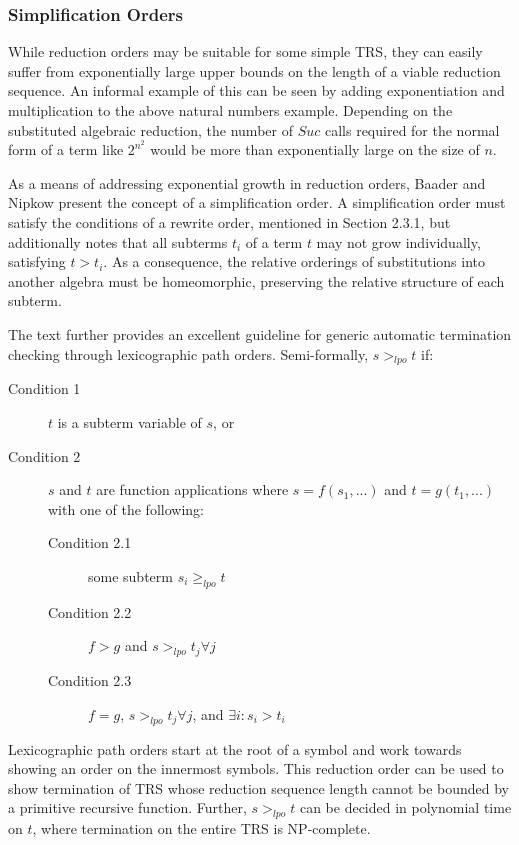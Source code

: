 \documentclass{article}
\begin{document}
\subsubsection{Simplification Orders}
While reduction orders may be suitable for some simple TRS, they can easily suffer from exponentially large upper bounds on the length of a viable reduction sequence.
An informal example of this can be seen by adding exponentiation and multiplication to the above natural numbers example.
Depending on the substituted algebraic reduction, the number of $Suc$ calls required for the normal form of a term like $2^{n^2}$ would be
more than exponentially large on the size of $n$.

As a means of addressing exponential growth in reduction orders, Baader and Nipkow \cite{baader1998term} present the concept of a simplification order.
A simplification order must satisfy the conditions of a rewrite order, mentioned in Section 2.3.1, but additionally notes that all subterms $t_i$ of a term $t$
may not grow individually, satisfying $t > t_i$. As a consequence, the relative orderings of substitutions into another algebra must be homeomorphic, preserving the relative
structure of each subterm.

The text further provides an excellent guideline for generic automatic termination checking through lexicographic path orders. Semi-formally, $s >_{lpo} t$ if:
\begin{description}
    \item[Condition 1] $t$ is a subterm variable of $s$, or
    \item[Condition 2] $s$ and $t$ are function applications where $s = f(s_1, ...)$ and $t = g(t_1,...)$ with one of the following:
    \begin{description}
        \item[Condition 2.1] some subterm $s_i \geq_{lpo} t$
        \item[Condition 2.2] $f > g$ and $s >_{lpo} t_j \forall j$
        \item[Condition 2.3] $f = g$, $s >_{lpo} t_j \forall j$, and $\exists i: s_i > t_i$
    \end{description}
\end{description}
Lexicographic path orders start at the root of a symbol and work towards showing an order on the innermost symbols.
This reduction order can be used to show termination of TRS whose reduction sequence length cannot be bounded by a primitive recursive function.
Further, $s >_{lpo} t$ can be decided in polynomial time on $t$, where termination on the entire TRS is NP-complete.
\end{document}
